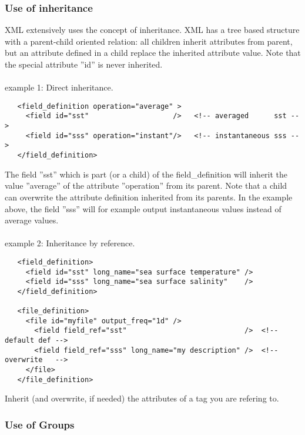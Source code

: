 \documentclass[NEMO_book]{subfiles}
\begin{document}
\subsubsection{Use of inheritance}

XML extensively uses the concept of inheritance. XML has a tree based structure with a parent-child oriented relation: all children inherit attributes from parent, but an attribute defined in a child replace the inherited attribute value. Note that the special attribute ''id'' is never inherited.  \\
\\
example 1: Direct inheritance.
\vspace{-20pt}
\begin{alltt}  {{\scriptsize    
\begin{verbatim}
   <field_definition operation="average" >
     <field id="sst"                    />   <!-- averaged      sst --> 
     <field id="sss" operation="instant"/>   <!-- instantaneous sss --> 
   </field_definition> 
\end{verbatim}
}}\end{alltt} 

The field ''sst'' which is part (or a child) of the field\_definition will inherit the value ''average'' 
of the attribute ''operation'' from its parent. Note that a child can overwrite 
the attribute definition inherited from its parents. In the example above, the field ''sss'' will 
for example output instantaneous values instead of average values. \\
\\
example 2: Inheritance by reference.
\vspace{-20pt}
\begin{alltt}  {{\scriptsize
\begin{verbatim}
   <field_definition>
     <field id="sst" long_name="sea surface temperature" />   
     <field id="sss" long_name="sea surface salinity"    />  
   </field_definition>      

   <file_definition>
     <file id="myfile" output_freq="1d" />   
       <field field_ref="sst"                            />  <!-- default def -->
       <field field_ref="sss" long_name="my description" />  <!-- overwrite   -->
     </file>   
   </file_definition> 
\end{verbatim}
}}\end{alltt} 
Inherit (and overwrite, if needed) the attributes of a tag you are refering to.

\subsubsection{Use of Groups}
\end{document}
